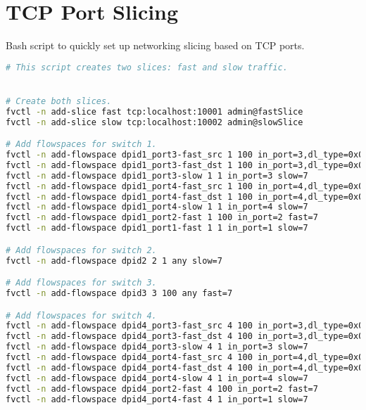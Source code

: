 \chapter{TCP Port Slicing} \label{annex:port_slicing}
Bash script to quickly set up networking slicing based on TCP ports.

\begin{lstlisting}[language=bash]
# This script creates two slices: fast and slow traffic.


# Create both slices.
fvctl -n add-slice fast tcp:localhost:10001 admin@fastSlice
fvctl -n add-slice slow tcp:localhost:10002 admin@slowSlice

# Add flowspaces for switch 1.
fvctl -n add-flowspace dpid1_port3-fast_src 1 100 in_port=3,dl_type=0x0800,nw_proto=6,tp_src=9999 fast=7  # Priority 100.
fvctl -n add-flowspace dpid1_port3-fast_dst 1 100 in_port=3,dl_type=0x0800,nw_proto=6,tp_dst=9999 fast=7
fvctl -n add-flowspace dpid1_port3-slow 1 1 in_port=3 slow=7
fvctl -n add-flowspace dpid1_port4-fast_src 1 100 in_port=4,dl_type=0x0800,nw_proto=6,tp_src=9999 fast=7
fvctl -n add-flowspace dpid1_port4-fast_dst 1 100 in_port=4,dl_type=0x0800,nw_proto=6,tp_dst=9999 fast=7
fvctl -n add-flowspace dpid1_port4-slow 1 1 in_port=4 slow=7
fvctl -n add-flowspace dpid1_port2-fast 1 100 in_port=2 fast=7
fvctl -n add-flowspace dpid1_port1-fast 1 1 in_port=1 slow=7

# Add flowspaces for switch 2.
fvctl -n add-flowspace dpid2 2 1 any slow=7

# Add flowspaces for switch 3.
fvctl -n add-flowspace dpid3 3 100 any fast=7 

# Add flowspaces for switch 4.
fvctl -n add-flowspace dpid4_port3-fast_src 4 100 in_port=3,dl_type=0x0800,nw_proto=6,tp_src=9999 fast=7
fvctl -n add-flowspace dpid4_port3-fast_dst 4 100 in_port=3,dl_type=0x0800,nw_proto=6,tp_dst=9999 fast=7
fvctl -n add-flowspace dpid4_port3-slow 4 1 in_port=3 slow=7
fvctl -n add-flowspace dpid4_port4-fast_src 4 100 in_port=4,dl_type=0x0800,nw_proto=6,tp_src=9999 fast=7
fvctl -n add-flowspace dpid4_port4-fast_dst 4 100 in_port=4,dl_type=0x0800,nw_proto=6,tp_dst=9999 fast=7
fvctl -n add-flowspace dpid4_port4-slow 4 1 in_port=4 slow=7
fvctl -n add-flowspace dpid4_port2-fast 4 100 in_port=2 fast=7
fvctl -n add-flowspace dpid4_port4-fast 4 1 in_port=1 slow=7
\end{lstlisting}